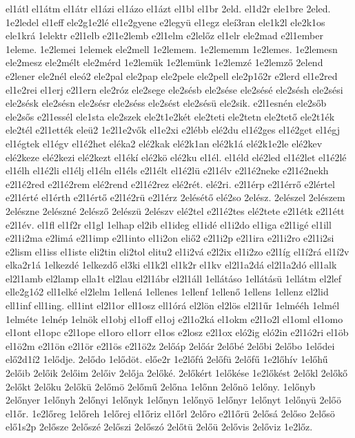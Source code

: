 {el1átl
el1átm
el1átr
el1ázi
el1ázo
el1ázt
el1bl
el1br
2eld.
el1d2r
ele1bre
2eled.
1e2ledel
el1eff
ele2g1e2lé
el1e2gyene
e2legyü
el1egz
eleí3ran
ele1k2l
ele2k1os
ele1krá
1elektr
e2l1elb
e2l1e2lemb
e2l1elm
e2lelőz
el1elr
ele2mad
e2l1ember
1eleme.
1e2lemei
1elemek
ele2mell
1e2lemem.
1e2lememm
1e2lemes.
1e2lemesn
ele2mesz
ele2mélt
ele2mérd
1e2lemük
1e2lemünk
1e2lemzé
1e2lemző
2elend
e2lener
ele2nél
eleó2
ele2pal
ele2pap
ele2pele
ele2pell
ele2p1ő2r
e2lerd
el1e2red
el1e2rei
el1erj
e2l1ern
ele2róz
ele2sege
ele2sésb
ele2sése
ele2sésé
ele2sésh
ele2sési
ele2sésk
ele2sésn
ele2sésr
ele2séss
ele2sést
ele2sésü
ele2sik.
e2l1esnén
ele2sőb
ele2sős
e2l1essél
ele1sta
ele2szek
ele2t1e2két
ele2teti
ele2tetn
ele2tető
ele2t1ék
ele2tél
e2l1ették
eleü2
1e2l1e2vők
el1e2xi
e2lébb
elé2du
el1é2ges
el1é2get
el1égj
el1égtek
el1égv
el1é2het
eléka2
elé2kak
elé2k1an
elé2k1á
elé2k1e2le
elé2kev
elé2keze
elé2kezi
elé2kezt
el1ékí
elé2kö
elé2ku
el1él.
el1éld
elé2led
el1é2let
el1é2lé
el1élh
el1é2li
el1élj
el1éln
el1éls
e2l1élt
el1é2lü
e2l1élv
e2l1é2neke
e2l1é2nekh
e2l1é2red
e2l1é2rem
elé2rend
e2l1é2rez
elé2rét.
elé2ri.
e2l1érp
e2l1érrő
e2lértel
e2l1érté
el1érth
e2l1értő
e2l1é2rü
e2l1érz
2elésétő
elé2so
2elész.
2elészel
2elészem
2elészne
2elészné
2elésző
2elészü
2elészv
elé2tel
e2l1é2tes
elé2tete
e2l1étk
e2l1étt
e2l1év.
el1fl
el1f2r
el1gl
1elhap
el2ib
el1ideg
el1idé
el1i2do
el1iga
e2l1igé
el1ill
e2l1i2ma
e2limá
e2l1imp
e2l1into
el1i2on
eliő2
e2l1i2p
e2l1ira
e2l1i2ro
e2l1i2si
e2lism
el1iss
el1iste
eli2tin
eli2tol
elitu2
el1i2vá
e2l2ix
el1i2zo
e2l1íg
el1í2rá
el1í2v
elka2r1á
1elkezdé
1elkezdő
el3ki
el1k2l
el1k2r
el1kv
el2l1a2dá
el2l1a2dó
ell1alk
el2l1amb
el2lamp
ella1t
el2lau
el2l1ábr
el2l1áll
1ellátáso
1ellátásü
1ellátm
el2lef
elle2g1ó2
ell1elké
el2lelm
1ellená
1ellenes
1ellenf
1ellenő
1ellens
1ellenz
el2lid
ell1inf
ell1ing.
ell1int
el2l1or
ell1osz
ell1órá
el2lön
el2lös
el2l1űr
1elmééh
1elmél
1elméte
1elnép
1elnök
el1obj
el1off
el1oj
e2l1o2ká
el1okm
e2l1o2l
el1oml
el1omo
el1ont
el1opc
e2l1ope
el1oro
el1orr
el1os
e2losz
e2l1ox
eló2ig
eló2in
e2l1ó2ri
el1öb
el1ö2m
e2l1ön
e2l1ör
e2l1ös
e2l1ö2z
2előáp
2előár
2előbé
2előbi
2előbo
1elődei
elő2d1í2
1elődje.
2elődo
1elődöt.
előe2r
1e2lőfú
2előfü
2előfű
1e2lőhív
1előhű
2előib
2előik
2előim
2előiv
2előja
2előké.
2előkért
1előkése
1e2lőkést
2előkl
2előkő
2előkt
2előku
2előkü
2előmö
2előmű
2előna
1előnn
2előnö
1előny.
1előnyb
2előnyer
1előnyh
2előnyi
1előnyk
1előnyn
1előnyö
1előnyr
1előnyt
1előnyü
2előö
el1őr.
1e2lőreg
1előreh
1előrej
el1őriz
el1őrl
2előro
e2l1őrü
2elősá
2előso
2elősö
elő1s2p
2elősze
2előszé
2előszi
2előszó
2előtü
2előü
2elővis
2előviz
1e2lőz.
}
